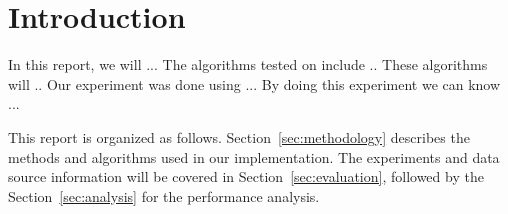 \section{Introduction}
In this report, we will ...
The algorithms tested on include ..
These algorithms will ..
Our experiment was done using ...
By doing this experiment we can know ...

This report is organized as follows.
Section~\ref{sec:methodology} describes the methods and algorithms used in our implementation.
The experiments and data source information will be covered in Section~\ref{sec:evaluation}, followed by the Section~\ref{sec:analysis} for the performance analysis.